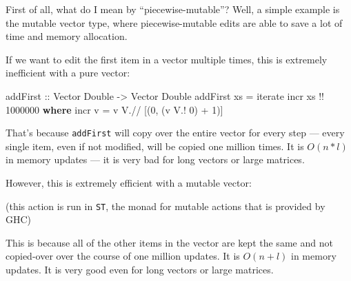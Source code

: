 \documentclass[]{article}
\newenvironment{Shaded}{}{}
\newcommand{\DataTypeTok}[1]{\textcolor[rgb]{0.56,0.13,0.00}{#1}}
\newcommand{\DecValTok}[1]{\textcolor[rgb]{0.25,0.63,0.44}{#1}}
\newcommand{\FunctionTok}[1]{\textcolor[rgb]{0.02,0.16,0.49}{#1}}
\newcommand{\KeywordTok}[1]{\textcolor[rgb]{0.00,0.44,0.13}{\textbf{#1}}}
\newcommand{\NormalTok}[1]{#1}
\newcommand{\OperatorTok}[1]{\textcolor[rgb]{0.40,0.40,0.40}{#1}}
\newcommand{\OtherTok}[1]{\textcolor[rgb]{0.00,0.44,0.13}{#1}}
\begin{document}
First of all, what do I mean by ``piecewise-mutable''? Well, a simple example is
the mutable vector type, where piecewise-mutable edits are able to save a lot of
time and memory allocation.

If we want to edit the first item in a vector multiple times, this is extremely
inefficient with a pure vector:

\begin{Shaded}
\begin{Highlighting}[]
\OtherTok{addFirst ::} \DataTypeTok{Vector} \DataTypeTok{Double} \OtherTok{{-}\textgreater{}} \DataTypeTok{Vector} \DataTypeTok{Double}
\NormalTok{addFirst xs }\OtherTok{=} \FunctionTok{iterate}\NormalTok{ incr xs }\OperatorTok{!!} \DecValTok{1000000}
  \KeywordTok{where}
\NormalTok{    incr v }\OtherTok{=}\NormalTok{ v }\OperatorTok{V.//}\NormalTok{ [(}\DecValTok{0}\NormalTok{, (v }\OperatorTok{V.!} \DecValTok{0}\NormalTok{) }\OperatorTok{+} \DecValTok{1}\NormalTok{)]}
\end{Highlighting}
\end{Shaded}

That's because \texttt{addFirst} will copy over the entire vector for every step
--- every single item, even if not modified, will be copied one million times.
It is \(O(n*l)\) in memory updates --- it is very bad for long vectors or large
matrices.

However, this is extremely efficient with a mutable vector:

\begin{Shaded}
\end{Shaded}

(this action is run in \texttt{ST}, the monad for mutable actions that is
provided by GHC)

This is because all of the other items in the vector are kept the same and not
copied-over over the course of one million updates. It is \(O(n+l)\) in memory
updates. It is very good even for long vectors or large matrices.
\end{document}
